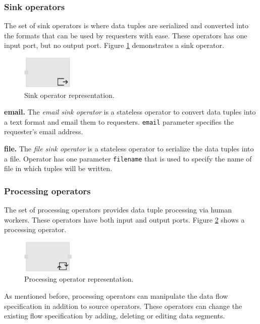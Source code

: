 \subsubsection{Sink operators}
The set of sink operators is where data tuples are serialized and converted into 
the formats that can be used by requesters with ease. These operators has one 
input port, but no output port. Figure \ref{fig:sink operator} demonstrates a sink operator.

\begin{figure}[ht]
	\centering
	\includegraphics[height=60px]{figures/SinkOperator.pdf}
	\caption{Sink operator representation.}
	\label{fig:sink operator}
\end{figure}

\textbf{email.}
The \textit{email sink operator} is a stateless operator to convert data tuples into a 
text format and email them to requesters. \texttt{email} parameter specifies the 
requester's email address. 

\textbf{file.}
The \textit{file sink operator} is a stateless operator to serialize the data tuples into 
a file. Operator has one parameter \texttt{filename} that is used to specify the name 
of file in which tuples will be written.

\subsubsection{Processing operators}
The set of processing operators provides data tuple processing via human workers. 
These operators have both input and output ports. Figure \ref{fig:processing operator} 
shows a processing operator.

\begin{figure}[ht]
	\centering
	\includegraphics[height=60px]{figures/ProcessingOperator.pdf}
	\caption{Processing operator representation.}
	\label{fig:processing operator}
\end{figure}

As mentioned before, processing operators can manipulate the data flow specification 
in addition to source operators. These operators can change the existing flow specification 
by adding, deleting or editing data segments.

